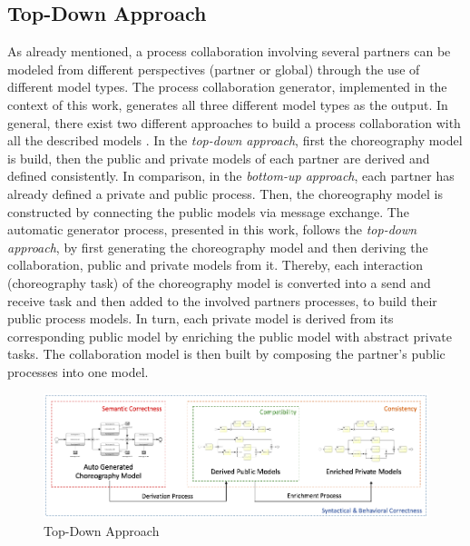 \documentclass[runningheads]{llncs}
\begin{document}
\subsection{Top-Down Approach}
As already mentioned, a process collaboration involving several partners can be modeled from different perspectives (partner or global) through the use of different model types. The process collaboration generator, implemented in the context of this work, generates all three different model types as the output. In general, there exist two different approaches to build a process collaboration with all the described models \cite{sabrina1174}. In the \textit{top-down approach}, first the choreography model is build, then the public and private models of each partner are derived and defined consistently. In comparison, in the \textit{bottom-up approach}, each partner has already defined a private and public process. Then, the choreography model is constructed by connecting the public models via message exchange. The automatic generator process, presented in this work, follows the \textit{top-down approach}, by first generating the choreography model and then deriving the collaboration, public and private models from it. Thereby, each interaction (choreography task) of the choreography model is converted into a send and receive task and then added to the involved partners processes, to build their public process models. In turn, each private model is derived from its corresponding public model by enriching the public model with abstract private tasks. The collaboration model is then built by composing the partner's public processes into one model.

\begin{figure}
\includegraphics[width=1\textwidth]{images/conception_approach.png}
\caption{Top-Down Approach}
\label{fig:topdownapproach}
\end{figure}
\end{document}
